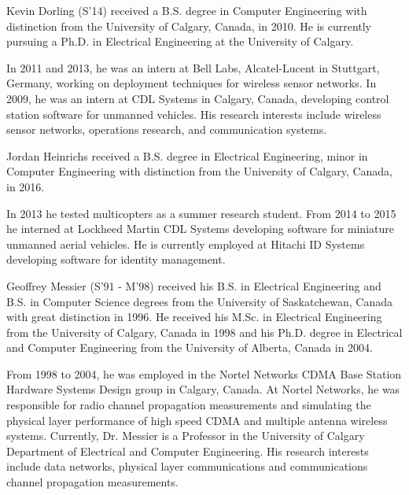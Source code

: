 \documentclass[journal]{IEEEtran}
\begin{document}
\vspace{-0.5in}
\begin{IEEEbiography}
{Kevin Dorling}
(S'14) received a B.S. degree in Computer Engineering with distinction from the University of Calgary, Canada, in 2010. He is currently pursuing a Ph.D. in Electrical Engineering at the University of Calgary.

In 2011 and 2013, he was an intern at Bell Labs, Alcatel-Lucent in Stuttgart, Germany, working on deployment techniques for wireless sensor networks. In 2009, he was an intern at CDL Systems in Calgary, Canada, developing control station software for unmanned vehicles. His research interests include wireless sensor networks, operations research, and communication systems.
\end{IEEEbiography}
\vspace{-0.5in}
\begin{IEEEbiography}
{Jordan Heinrichs}
received a B.S. degree in Electrical Engineering, minor in Computer Engineering with distinction from the University of Calgary, Canada, in 2016.

In 2013 he tested multicopters as a summer research student. From 2014 to 2015 he interned at Lockheed Martin CDL Systems developing software for miniature unmanned aerial vehicles. He is currently employed at Hitachi ID Systems developing software for identity management.
\end{IEEEbiography}
\vspace{-0.5in}
\begin{IEEEbiography}
{Geoffrey Messier}
(S'91 - M'98) received his B.S. in Electrical
Engineering and B.S. in Computer Science degrees from the University of
Saskatchewan, Canada with great distinction in 1996.  He received his
M.Sc. in Electrical Engineering from the University of Calgary, Canada
in 1998 and his Ph.D. degree in Electrical and Computer Engineering from
the University of Alberta, Canada in 2004.

From 1998 to 2004, he was employed in the Nortel Networks CDMA Base
Station Hardware Systems Design group in Calgary, Canada.  At Nortel
Networks, he was responsible for radio channel propagation measurements
and simulating the physical layer performance of high speed CDMA and
multiple antenna wireless systems.  Currently, Dr. Messier is a
Professor in the University of Calgary Department of
Electrical and Computer Engineering.  His research interests include
data networks, physical layer communications and communications
channel propagation measurements.
\end{IEEEbiography}
\end{document}
